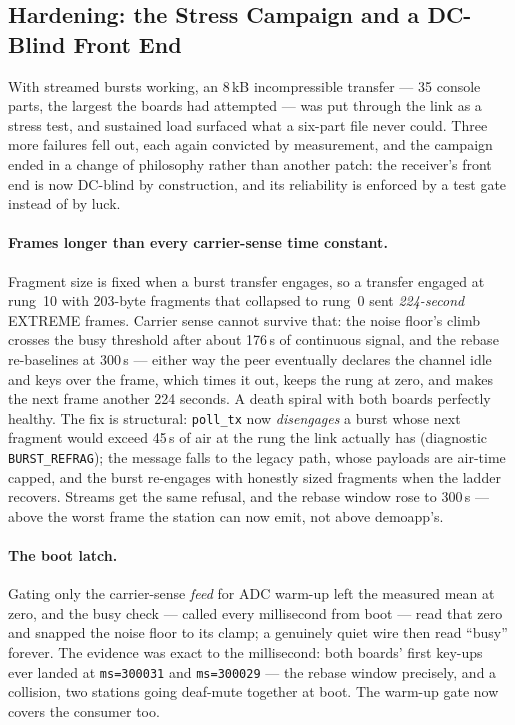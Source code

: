 \subsection{Hardening: the Stress Campaign and a DC-Blind Front End}
\label{sec:cport_harden}

With streamed bursts working, an 8\,kB incompressible transfer --- 35
console parts, the largest the boards had attempted --- was put through
the link as a stress test, and sustained load surfaced what a
six-part file never could. Three more failures fell out, each again
convicted by measurement, and the campaign ended in a change of
philosophy rather than another patch: the receiver's front end is now
DC-blind by construction, and its reliability is enforced by a test
gate instead of by luck.

\paragraph{Frames longer than every carrier-sense time constant.}
Fragment size is fixed when a burst transfer engages, so a transfer
engaged at rung~10 with 203-byte fragments that collapsed to rung~0
sent \emph{224-second} EXTREME frames. Carrier sense cannot survive
that: the noise floor's climb crosses the busy threshold after about
176\,s of continuous signal, and the rebase re-baselines at 300\,s ---
either way the peer eventually declares the channel idle and keys over
the frame, which times it out, keeps the rung at zero, and makes the
next frame another 224 seconds. A death spiral with both boards
perfectly healthy. The fix is structural: \texttt{poll\_tx} now
\emph{disengages} a burst whose next fragment would exceed 45\,s of air
at the rung the link actually has (diagnostic \texttt{BURST\_REFRAG});
the message falls to the legacy path, whose payloads are air-time
capped, and the burst re-engages with honestly sized fragments when the
ladder recovers. Streams get the same refusal, and the rebase window
rose to 300\,s --- above the worst frame the station can now emit, not
above demoapp's.

\paragraph{The boot latch.} Gating only the carrier-sense \emph{feed}
for ADC warm-up left the measured mean at zero, and the busy check ---
called every millisecond from boot --- read that zero and snapped the
noise floor to its clamp; a genuinely quiet wire then read ``busy''
forever. The evidence was exact to the millisecond: both boards' first
key-ups ever landed at \texttt{ms=300031} and \texttt{ms=300029} ---
the rebase window precisely, and a collision, two stations going
deaf-mute together at boot. The warm-up gate now covers the consumer
too.

